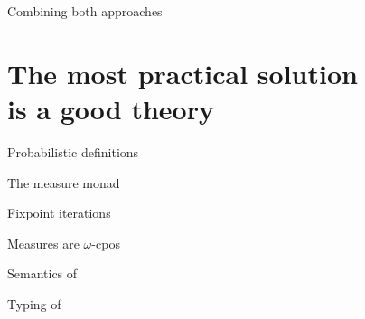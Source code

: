 \documentclass{beamer}
\begin{document}

\begin{frame}{Combining both approaches}
  \begin{center}
  \end{center}
\end{frame}


\section{The most practical solution\\
is a good theory}


\begin{frame}{Probabilistic definitions}

\end{frame}


\begin{frame}{The measure monad}

\end{frame}


\begin{frame}{Fixpoint iterations}

\end{frame}


\begin{frame}{Measures are $\omega$-cpos}

\end{frame}


\begin{frame}{Semantics of \rml}
  
\end{frame}


\begin{frame}{Typing of \rml}

\end{frame}




\end{document}
